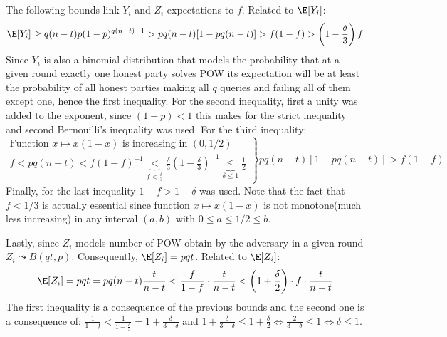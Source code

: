 \documentclass[..]{subfiles}
\begin{document}
The following bounds link $Y_i$ and $Z_i$ expectations to $f$. Related to $\E[Y_i]$:
$$\E[Y_i] \ge q(n-t)p(1-p)^{q(n-t)-1} > pq(n-t)[1 - pq(n-t)] > f(1-f) > \left(1-\frac{\delta}3\right)f$$
Since $Y_i$ is also a binomial distribution that models the probability that at a given round exactly one honest party solves POW its expectation will be at least the probability of all honest parties making all $q$ queries and failing all of them except one, hence the first inequality. For the second inequality, first a unity was added to the exponent, since $(1-p) < 1$ this makes for the strict inequality and second Bernouilli's inequality was used. For the third inequality:
\[ 
\left. \begin{array}{r} 
	\textrm{Function }x \mapsto x(1-x) \textrm{ is increasing in } (0,1/2)\\[1ex]
	f < pq(n-t) < f(1-f)^{-1} \underbrace{<}_\text{$f < \frac{\delta}{3}$} \frac{\delta}{3}(1-\frac{\delta}{3})^{-1} \underbrace{\le}_\text{$\delta \le 1$} \frac{1}{2}
\end{array} \right\} 
pq(n-t)[1 - pq(n-t)] > f(1-f)
\]
Finally, for the last inequality $1-f > 1-\delta$ was used. Note that the fact that $f < 1/3$ is actually essential since function $x \mapsto x(1-x)$ is not monotone(much less increasing) in any interval $(a, b)$ with $0 \le a \le 1/2 \le b$.

Lastly, since $Z_i$ models number of POW obtain by the adversary in a given round $Z_i \leadsto B(qt, p)$. Consequently, $\E[Z_i] = pqt$. Related to $\E[Z_i]$:
$$\E[Z_i] = pqt = pq(n-t) \frac{t}{n-t} <  \frac{f}{1-f} \cdot \frac{t}{n-t} < \left(1+\frac{\delta}{2}\right) \cdot f \cdot \frac{t}{n-t}$$
The first inequality is a consequence of the previous bounds and the second one is a consequence of: $\frac{1}{1-f} < \frac{1}{1-\frac{\delta}{3}} = 1 + \frac{\delta}{3-\delta}$ and $1 + \frac{\delta}{3-\delta} \le 1 + \frac{\delta}{2} \iff \frac{2}{3-\delta} \le 1 \iff \delta \le 1$.
\end{document}

